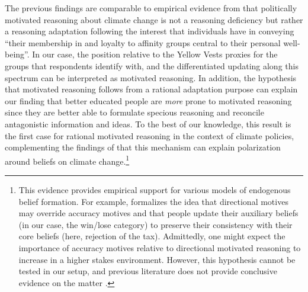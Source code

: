 \documentclass[12pt]{article} %
\begin{document}
\begin{appendices}
The previous findings are comparable to empirical evidence from \citet{kahan_ideology_2013} that politically motivated reasoning about climate change is not a reasoning deficiency but rather a reasoning adaptation following the interest that individuals have in conveying ``their membership in and loyalty to affinity groups central to their personal well-being''. In our case, the position relative to the Yellow Vests proxies for the groups that respondents identify with, and the differentiated updating along this spectrum can be interpreted as motivated reasoning. In addition, the hypothesis that motivated reasoning follows from a rational adaptation purpose can explain our finding that better educated people are \textit{more} prone to motivated reasoning since they are better able to formulate specious reasoning and reconcile antagonistic information and ideas. To the best of our knowledge, this result is the first case for rational motivated reasoning in the context of climate policies, complementing the findings of \citet{druckman_evidence_2019} that this mechanism can explain polarization around beliefs on climate change.\footnote{This evidence provides empirical support for various models of endogenous belief formation. For example, \citet{little_distortion_2019} formalizes the idea that directional motives may override accuracy motives and that people update their auxiliary beliefs (in our case, the win/lose category) to preserve their consistency with their core beliefs (here, rejection of the tax). Admittedly, one might expect the importance of accuracy motives relative to directional motivated reasoning to increase in a higher stakes environment. However, this hypothesis cannot be tested in our setup, and previous literature does not provide conclusive evidence on the matter \citep{ziva_kunda_case_1990,camerer_hogarth_1999}.}


\end{appendices}
\end{document}
